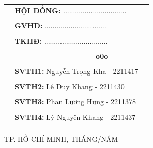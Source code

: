 \documentclass[a4paper]{article}
\theoremstyle{definition}
\begin{document}
\begin{titlepage}
\begin{center}
\begin{tabular}{c}
\end{tabular}
\end{center}
\vspace{0.5cm}
\begin{table}[h]
\begin{tabular}{rll}
\hspace{6 cm} &  \textbf{\Large HỘI ĐỒNG:} {\Large ................................}
\\
\\
\hspace{6 cm} &   \textbf{\Large GVHD:} {\Large ...............................}
\\
\\
\hspace{6 cm}  &   \textbf{\Large TKHĐ:} {\Large ................................}
\\
\\
\hspace{6 cm} &     \textbf{$\;$ $\;$$\;$$\;$$\;$$\;$$\;$$\;$$\;$$\;$$\;$$\;$$\;$$\;$$\;$$\;$$\;$$\;$$\;$$\;$$\;$$\;$$\;$$\;$$\;$$\;$$\;$$\;$$\;$$\;$$\;$$\;$$\;$$\;$ \Large ---o0o---} 
\\
\\
\hspace{6 cm} &   \textbf{\Large SVTH1:} {\Large Nguyễn Trọng Kha - 2211417}
\\
\\
\hspace{6 cm} &   \textbf{\Large SVTH2:}  {\Large Lê Duy Khang - 2211430}
\\
\\
\hspace{6 cm} &   \textbf{\Large SVTH3:}  {\Large Phan Lương Hưng - 2211378}
\\
\\
\hspace{6 cm} &   \textbf{\Large SVTH4:}  {\Large Lý Nguyên Khang - 2211437}
\\
\\
\end{tabular}
\end{table}
\vspace{0.5cm}
\begin{center}
{\Large TP. HỒ CHÍ MINH, THÁNG/NĂM}
\end{center}
\end{titlepage}
\newpage



\newpage
\tableofcontents
\newpage
\listoffigures
\newpage
\listoftables
\newpage
\setcounter{page}{1}
\end{document}

